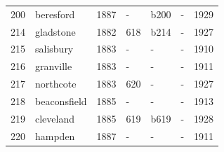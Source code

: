 \documentclass{article}
\begin{document}
\begin{tabular}{lllllll}
200 & beresford & 1887 & - & b200 & - & 1929 \\
214 & gladstone & 1882 & 618 & b214 & - & 1927 \\
215 & salisbury & 1883 & - & - & - & 1910 \\
216 & granville & 1883 & - & - & - & 1911 \\
217 & northcote & 1883 & 620 & - & - & 1927 \\
218 & beaconsfield & 1885 & - & - & - & 1913 \\
219 & cleveland & 1885 & 619 & b619 & - & 1928 \\
220 & hampden & 1887 & - & - & - & 1911 \\
\bottomrule
\end{tabular}
\end{document}
